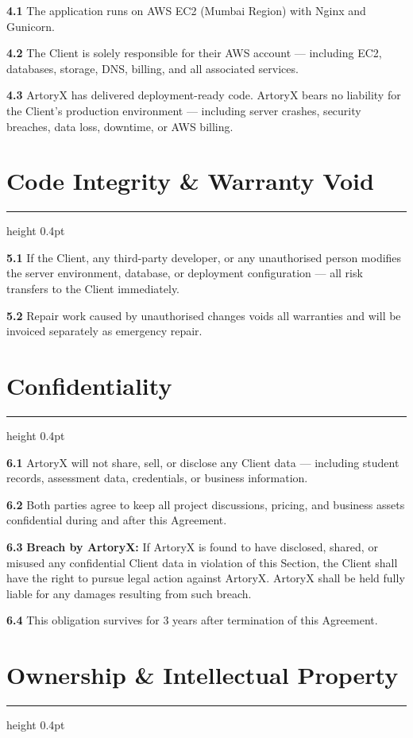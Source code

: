 \documentclass[a4paper, 11pt]{article}
\newcommand{\sectionrule}{%
  {\color{bordergray}\hrule height 0.4pt}%
  \vspace{5pt}%
}
\newcommand{\clausenum}[1]{%
  {\color{accent}\textbf{#1}}\;%
}
\begin{document}
{\small
\clausenum{4.1} The application runs on AWS EC2 (Mumbai Region) with Nginx and Gunicorn.

\clausenum{4.2} The Client is solely responsible for their AWS account --- including EC2, databases, storage, DNS, billing, and all associated services.

\clausenum{4.3} ArtoryX has delivered deployment-ready code. ArtoryX bears no liability for the Client's production environment --- including server crashes, security breaches, data loss, downtime, or AWS billing.
}


\section{Code Integrity \& Warranty Void}
\sectionrule

{\small
\clausenum{5.1} If the Client, any third-party developer, or any unauthorised person modifies the server environment, database, or deployment configuration --- all risk transfers to the Client immediately.

\clausenum{5.2} Repair work caused by unauthorised changes voids all warranties and will be invoiced separately as emergency repair.
}


\section{Confidentiality}
\sectionrule

{\small
\clausenum{6.1} ArtoryX will not share, sell, or disclose any Client data --- including student records, assessment data, credentials, or business information.

\clausenum{6.2} Both parties agree to keep all project discussions, pricing, and business assets confidential during and after this Agreement.

\clausenum{6.3}\textbf{Breach by ArtoryX:}
If ArtoryX is found to have disclosed, shared, or misused any confidential Client data in violation of this Section, the Client shall have the right to pursue legal action against ArtoryX. ArtoryX shall be held fully liable for any damages resulting from such breach.

\clausenum{6.4} This obligation survives for 3 years after termination of this Agreement.
}


\section{Ownership \& Intellectual Property}
\sectionrule
\end{document}
